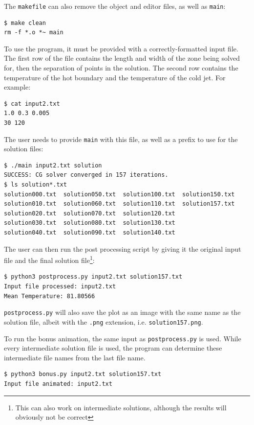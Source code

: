 \documentclass{article}
\begin{document}
The \texttt{makefile} can also remove the object and editor files, as well as \texttt{main}:

\begin{verbatim}
$ make clean
rm -f *.o *~ main
\end{verbatim}

To use the program, it must be provided with a correctly-formatted input file. The first row of the file contains the length and width of the zone being solved for, then the separation of points in the solution.  The second row contains the temperature of the hot boundary and the temperature of the cold jet.  For example:

\begin{verbatim}
$ cat input2.txt
1.0 0.3 0.005
30 120
\end{verbatim}

The user needs to provide \texttt{main} with this file, as well as a prefix to use for the solution files:

\begin{verbatim}
$ ./main input2.txt solution
SUCCESS: CG solver converged in 157 iterations.
$ ls solution*.txt
solution000.txt  solution050.txt  solution100.txt  solution150.txt
solution010.txt  solution060.txt  solution110.txt  solution157.txt
solution020.txt  solution070.txt  solution120.txt
solution030.txt  solution080.txt  solution130.txt
solution040.txt  solution090.txt  solution140.txt
\end{verbatim}

The user can then run the post processing script by giving it the original input file and the final solution file\footnote{This can also work on intermediate solutions, although the results will obviously not be correct}:

\begin{verbatim}
$ python3 postprocess.py input2.txt solution157.txt
Input file processed: input2.txt
Mean Temperature: 81.80566
\end{verbatim}

\texttt{postprocess.py} will also save the plot as an image with the same name as the solution file, albeit with the \texttt{.png} extension, i.e. \texttt{solution157.png}.

To run the bonus animation, the same input as \texttt{postprocess.py} is used.  While every intermediate solution file is used, the program can determine these intermediate file names from the last file name.

\begin{verbatim}
$ python3 bonus.py input2.txt solution157.txt
Input file animated: input2.txt
\end{verbatim}
\end{document}
